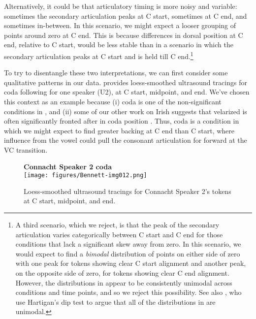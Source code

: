 \documentclass[output=paper,colorlinks,citecolor=brown]{langscibook}
\begin{document}
Alternatively, it could be that articulatory timing is more noisy and variable: sometimes the secondary articulation peaks at C start, sometimes at C end, and sometimes in-between. In this scenario, we might expect a looser grouping of points around zero at C end. This is because differences in dorsal position at C end, relative to C start, would be less stable than in a scenario in which the secondary articulation peaks at C start and is held till C end.\footnote{A third scenario, which we reject, is that the peak of the secondary articulation varies categorically between C start and C end for those conditions that lack a significant skew away from zero. In this scenario, we would expect to find a \emph{bimodal} distribution of points on either side of zero with one peak for tokens showing clear C start alignment and another peak, on the opposite side of zero, for tokens showing clear C end alignment. However, the distributions in  appear to be consistently unimodal across conditions and time points, and so we reject this possibility. See also \citet{Padgett_etal2023_Irish_pal_syllpos}, who use Hartigan's dip test to argue that all of the distributions in  are unimodal.}

To try to disentangle these two interpretations, we can first consider some qualitative patterns in our data.  provides loess-smoothed ultrasound tracings for coda  following  for one speaker (U2), at C start, midpoint, and end. We've chosen this context as an example because (i) coda  is one of the non-significant conditions in , and (ii) some of our other work on Irish suggests that velarized  is often significantly fronted after  in coda position \citep{Bennett_etal2023_jphon_submission}. Thus, coda  is a condition in which we might expect to find greater backing at C end than C start, where influence from the vowel  could pull the consonant articulation for  forward at the VC transition.

\begin{figure}
    \centering
    \textbf{Connacht Speaker 2 coda }\\
    \texttt{[image: figures/Bennett-img012.png]}
    \caption{Loess-smoothed ultrasound tracings for Connacht Speaker 2's  tokens at C start, midpoint, and end.}
    \label{fig:C2-coda_iT}
\end{figure}
\end{document}
